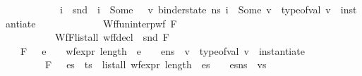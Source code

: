 \begin{isabellebody}
\ \ \ \ \ \ \ \ \ \ {\isachardoublequoteopen}{\isasymforall}\ i\ {\isasymtau}{\isacharprime}{\kern0pt}{\isachardot}{\kern0pt}\ {\isacharparenleft}{\kern0pt}{\isacharparenleft}{\kern0pt}snd\ {\isasymDelta}{\isacharparenright}{\kern0pt}\ i\ {\isacharequal}{\kern0pt}\ Some\ {\isasymtau}{\isacharprime}{\kern0pt}{\isacharparenright}{\kern0pt}\ {\isasymlongrightarrow}\ {\isacharparenleft}{\kern0pt}{\isasymexists}v{\isachardot}{\kern0pt}\ binder{\isacharunderscore}{\kern0pt}state\ n{\isacharunderscore}{\kern0pt}s\ i\ {\isacharequal}{\kern0pt}\ Some\ v\ {\isasymand}\ type{\isacharunderscore}{\kern0pt}of{\isacharunderscore}{\kern0pt}val\ v\ {\isacharequal}{\kern0pt}\ instantiate\ {\isasymOmega}\ {\isasymtau}{\isacharprime}{\kern0pt}{\isacharparenright}{\kern0pt}{\isachardoublequoteclose}\ \isanewline
\ \ \ \ \ \ \ \ \ \ Wf{\isacharunderscore}{\kern0pt}{\isasymGamma}{\isacharcolon}{\kern0pt}{\isachardoublequoteopen}fun{\isacharunderscore}{\kern0pt}interp{\isacharunderscore}{\kern0pt}wf\ F\ {\isasymGamma}{\isachardoublequoteclose}\ \isanewline
\ \ \ \ \ \ \ \ \ \ Wf{\isacharunderscore}{\kern0pt}F{\isacharcolon}{\kern0pt}{\isachardoublequoteopen}list{\isacharunderscore}{\kern0pt}all\ {\isacharparenleft}{\kern0pt}wf{\isacharunderscore}{\kern0pt}fdecl\ {\isasymcirc}\ snd{\isacharparenright}{\kern0pt}\ F{\isachardoublequoteclose}\ \ \ \ \ \ \ \ \ \ \isanewline
\ \ \ {\isachardoublequoteopen}F{\isacharcomma}{\kern0pt}\ {\isasymDelta}\ {\isasymturnstile}\ e\ {\isacharcolon}{\kern0pt}\ {\isasymtau}\ {\isasymLongrightarrow}\ wf{\isacharunderscore}{\kern0pt}expr\ {\isacharparenleft}{\kern0pt}length\ {\isasymOmega}{\isacharparenright}{\kern0pt}\ e\ {\isasymLongrightarrow}\ {\isasymLambda}{\isacharcomma}{\kern0pt}{\isasymGamma}{\isacharcomma}{\kern0pt}{\isasymOmega}\ {\isasymturnstile}\ {\isasymlangle}e{\isacharcomma}{\kern0pt}n{\isacharunderscore}{\kern0pt}s{\isasymrangle}\ {\isasymDown}\ v\ {\isasymLongrightarrow}\ type{\isacharunderscore}{\kern0pt}of{\isacharunderscore}{\kern0pt}val\ v\ {\isacharequal}{\kern0pt}\ instantiate\ {\isasymOmega}\ {\isasymtau}{\isachardoublequoteclose}\ \ \isanewline
\ \ \ \ \ \ \ \ {\isachardoublequoteopen}F{\isacharcomma}{\kern0pt}\ {\isasymDelta}\ {\isasymturnstile}\ es\ {\isacharbrackleft}{\kern0pt}{\isacharcolon}{\kern0pt}{\isacharbrackright}{\kern0pt}\ ts\ {\isasymLongrightarrow}\ list{\isacharunderscore}{\kern0pt}all\ {\isacharparenleft}{\kern0pt}wf{\isacharunderscore}{\kern0pt}expr\ {\isacharparenleft}{\kern0pt}length\ {\isasymOmega}{\isacharparenright}{\kern0pt}{\isacharparenright}{\kern0pt}\ es\ {\isasymLongrightarrow}\ {\isasymLambda}{\isacharcomma}{\kern0pt}{\isasymGamma}{\isacharcomma}{\kern0pt}{\isasymOmega}\ {\isasymturnstile}\ {\isasymlangle}es{\isacharcomma}{\kern0pt}n{\isacharunderscore}{\kern0pt}s{\isasymrangle}\ {\isacharbrackleft}{\kern0pt}{\isasymDown}{\isacharbrackright}{\kern0pt}\ vs\ {\isasymLongrightarrow}\isanewline

\end{isabellebody}
